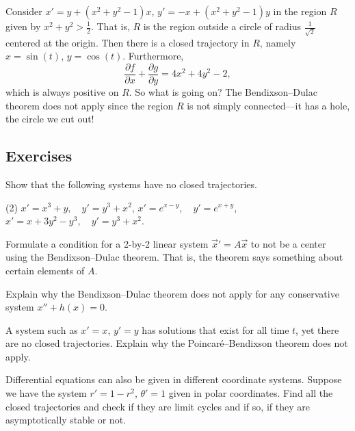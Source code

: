 \begin{example}
Consider
$x' = y+(x^2+y^2-1)x$, 
$y' = -x +(x^2+y^2-1)y$ in the region $R$ given by $x^2+y^2 >
\frac{1}{2}$.  That is, $R$ is the region outside a circle of radius
$\frac{1}{\sqrt{2}}$ centered at the origin.  Then
there is a closed trajectory in $R$, namely $x=\sin(t)$, $y=\cos(t)$.
Furthermore,
\begin{equation*}
\frac{\partial f}{\partial x} + 
\frac{\partial g}{\partial y} = 4x^2+4y^2-2 ,
\end{equation*}
which is always positive on $R$.  So what is going on?  The Bendixson--Dulac theorem does not
apply since the region $R$ is not simply connected---it has a hole, the
circle we cut out!
\end{example}

\subsection{Exercises}

\begin{exercise}
Show that the following systems have no closed trajectories.
\begin{tasks}(2)
\task $x'=x^3+y,\quad y'=y^3+x^2$,
\task $x'=e^{x-y},\quad y'=e^{x+y}$,
\task $x'=x+3y^2-y^3,\quad y'=y^3+x^2$.
\end{tasks}
\end{exercise}

\begin{exercise}
Formulate a condition for a 2-by-2 linear system
${\vec{x}}' = A \vec{x}$ to not be a center using the Bendixson--Dulac theorem.
That is, the theorem says something about certain elements of $A$.
\end{exercise}

\begin{exercise}
Explain why the Bendixson--Dulac theorem does not apply for any conservative
system $x''+h(x) = 0$.
\end{exercise}

\begin{exercise}
A system such as $x'=x$, $y'=y$ has solutions that exist for all time $t$,
yet there are no closed trajectories.  Explain
why the Poincar\'e--Bendixson theorem does not apply.
\end{exercise}

\begin{exercise}
Differential equations can also be given in different coordinate systems.  
Suppose we have the system $r' = 1-r^2$, $\theta' = 1$ given
in polar coordinates.  Find all the closed trajectories and check if they
are limit cycles and if so, if they are asymptotically stable or not.
\end{exercise}


